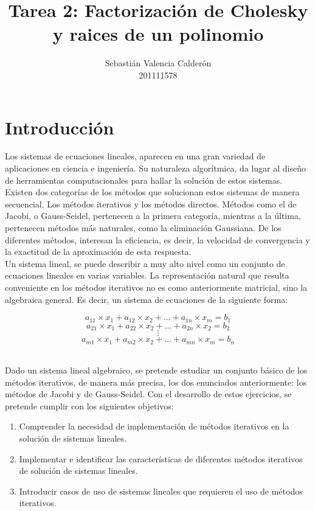 \documentclass[11pt, spanish]{article}
\date{}
\begin{document}
\renewcommand\lstlistlistingname{Lista de Scripts}

\author{Sebastián Valencia Calderón \\ 201111578}
\title{Tarea 2: Factorización de Cholesky y raices de un polinomio}
\maketitle

\section{Introducción}

Los sistemas de ecuaciones lineales, aparecen en una gran variedad de aplicaciones en ciencia e ingeniería. Su naturaleza algorítmica, da lugar al diseño de herramientas computacionales para hallar la solución de estos sistemas. Existen dos categorías de los métodos que solucionan estos sistemas de manera secuencial. Los métodos iterativos y los métodos directos. Métodos como el de Jacobi, o Gauss-Seidel, pertenecen a la primera categoría, mientras a la última, pertenecen métodos más naturales, como la eliminación Gaussiana. De los diferentes métodos, interesan la eficiencia, es decir, la velocidad de convergencia y la exactitud de la aproximación de esta respuesta.\\

Un sistema lineal, se puede describir a muy alto nivel como un conjunto de ecuaciones lineales en varias variables. La representación natural que resulta conveniente en los métodos iterativos no es como anteriormente matricial, sino la algebraica general. Es decir, un sistema de ecuaciones de la siguiente forma:

$$ a_{11} \times x_1 + a_{12} \times x_2 + \dots + a_{1n} \times x_m = b_1 $$
$$ a_{21} \times x_1 + a_{22} \times x_2 + \dots + a_{2n} \times x_2 = b_2 $$
$$ \vdots $$
$$ a_{m1} \times x_1 + a_{m2} \times x_2 + \dots + a_{mn} \times x_m = b_n $$ \


Dado un sistema lineal algebraico, se pretende estudiar un conjunto básico de los métodos iterativos, de manera más precisa, los dos enunciados anteriormente: los métodos de Jacobi y de Gauss-Seidel. Con el desarrollo de estos ejercicios, se pretende cumplir con los siguientes objetivos:

\begin{enumerate}
\item Comprender la necesidad de implementación de métodos iterativos en la solución de sistemas lineales.
\item Implementar e identificar las características de diferentes métodos iterativos de solución de sistemas lineales.
\item Introducir casos de uso de sistemas lineales que requieren el uso de métodos iterativos.
\end{enumerate}
\end{document}

